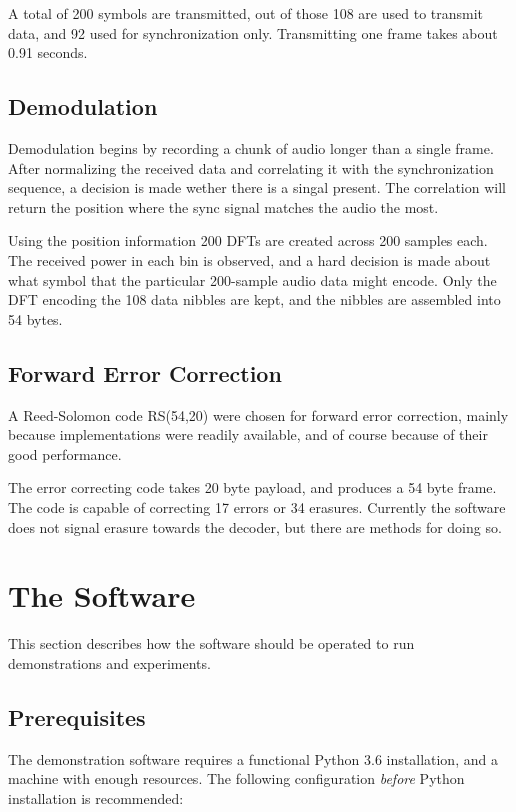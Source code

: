 \documentclass[a4paper]{article}
\begin{document}
A total of 200 symbols are transmitted, out of those 108 are used to
transmit data, and 92 used for synchronization only. Transmitting one
frame takes about 0.91 seconds.

\subsection{Demodulation}

Demodulation begins by recording a chunk of audio longer than a single
frame. After normalizing the received data and correlating it with the
synchronization sequence, a decision is made wether there is a singal
present. The correlation will return the position where the sync signal
matches the audio the most.

Using the position information 200 DFTs are created across 200 samples
each. The received power in each bin is observed, and a hard decision
is made about what symbol that the particular 200-sample audio data
might encode. Only the DFT encoding the 108 data nibbles are kept, and
the nibbles are assembled into 54 bytes.

\subsection{Forward Error Correction}

A Reed-Solomon code RS(54,20) were chosen for forward error correction,
mainly because implementations were readily available, and of course
because of their good performance.

The error correcting code takes 20 byte payload, and produces a 54 byte
frame. The code is capable of correcting 17 errors or 34 erasures.
Currently the software does not signal erasure towards the decoder,
but there are methods\cite{ft1} for doing so.

\section{The Software}

This section describes how the software should be operated to run
demonstrations and experiments.

\subsection{Prerequisites}

The demonstration software requires a functional Python 3.6 
installation, and a machine with enough resources. The following 
configuration \textit{before} Python installation is recommended:
\end{document}
